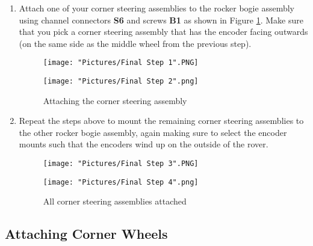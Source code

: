 \documentclass{article}
\begin{document}
\begin{enumerate}

\item Attach one of your corner steering assemblies to the rocker bogie assembly using channel connectors \textbf{S6} and screws \textbf{B1} as shown in Figure \ref{attaching corner wheel}. Make sure that you pick a corner steering assembly that has the encoder facing outwards (on the same side as the middle wheel from the previous step).

\begin{figure}[H]
  \centering
  \begin{minipage}[b]{0.45\textwidth}
    \texttt{[image: "Pictures/Final Step 1".PNG]}
  \end{minipage}
  \hfill
  \begin{minipage}[b]{0.45\textwidth}
    \texttt{[image: "Pictures/Final Step 2".png]}
  \end{minipage}
  \caption{Attaching the corner steering assembly}
  \label{attaching corner wheel}
\end{figure}


\item Repeat the steps above to mount the remaining corner steering assemblies to the other rocker bogie assembly, again making sure to select the encoder mounts such that the encoders wind up on the outside of the rover.

\begin{figure}[H]
  \centering
  \begin{minipage}[b]{0.45\textwidth}
    \texttt{[image: "Pictures/Final Step 3".PNG]}
  \end{minipage}
  \hfill
  \begin{minipage}[b]{0.45\textwidth}
    \texttt{[image: "Pictures/Final Step 4".png]}
  \end{minipage}
  \caption{All corner steering assemblies attached}
\end{figure}

\end{enumerate}

\subsection{Attaching Corner Wheels}
\end{document}
